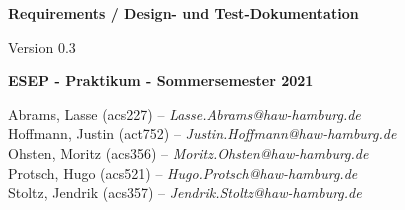 \begin{titlepage}
    \begin{center}
        \begin{huge}
            \textbf{Requirements / Design- und Test-Dokumentation}
        \end{huge}

        \begin{large}
            \vspace{0.5cm}
            Version 0.3

            \vspace{0.5cm}

            \textbf{ESEP - Praktikum - Sommersemester 2021}
        \end{large}

        \vspace{0.5cm}

        \vfill

        Abrams, Lasse (acs227) -- \textit{Lasse.Abrams@haw-hamburg.de}\\
        Hoffmann, Justin (act752) -- \textit{Justin.Hoffmann@haw-hamburg.de}\\
        Ohsten, Moritz (acs356) -- \textit{Moritz.Ohsten@haw-hamburg.de}\\
        Protsch, Hugo (acs521) -- \textit{Hugo.Protsch@haw-hamburg.de}\\
        Stoltz, Jendrik (acs357) -- \textit{Jendrik.Stoltz@haw-hamburg.de}\\
    \end{center}
\end{titlepage}
